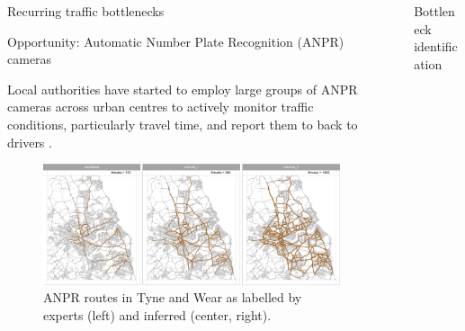 \documentclass[final]{beamer}
\newlength{\sepwidth}
\newlength{\colwidth}
\newcommand{\separatorcolumn}{\begin{column}{\sepwidth}\end{column}}
\begin{document}
\begin{frame}[t]
\begin{columns}[t]
\begin{column}{\colwidth}
\begin{block}{Recurring traffic bottlenecks}
  \end{block}

  \begin{alertblock}{Opportunity: Automatic Number Plate Recognition (ANPR) cameras}

    Local authorities have started to employ large groups of ANPR cameras
    across urban centres to actively monitor traffic conditions, particularly
    travel time, and report them to back to drivers \cite{silva2018}.

    \begin{figure}
      \centering
      \includegraphics[width=0.95\linewidth]{routes_by_label.png}
      \caption{ANPR routes in Tyne and Wear as labelled by experts (left) and
               inferred (center, right).}
      \label{fig:anpr_routes}
    \end{figure}

  \end{alertblock}

\end{column}

\separatorcolumn

\begin{column}{\colwidth}

  \begin{block}{Bottleneck identification }




\end{block}
\end{column}
\end{columns}
\end{frame}
\end{document}
